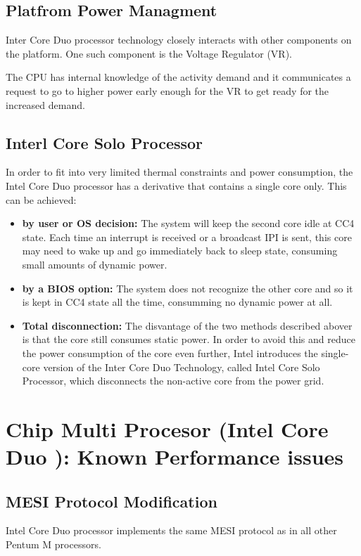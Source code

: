 \subsection{Platfrom Power Managment}
Inter Core Duo processor technology closely interacts with other components on the platform. One such component is the Voltage Regulator (VR).

The CPU has internal knowledge of the activity demand and it communicates a request to go to higher power early enough for the VR to get ready for the increased demand.

\subsection{Interl Core Solo Processor}
In order to fit into very limited thermal constraints and power consumption, the Intel Core Duo processor has a derivative that contains a single core only. This can be achieved:

\begin{itemize}
	\item \textbf{by user or OS decision: }The system will keep the second core idle at CC4 state. Each time an interrupt is received or a broadcast IPI is sent, this core may need to wake up and go immediately back to sleep state, consuming small amounts of dynamic power.
	\item \textbf{by a BIOS option:} The system does not recognize the other core and so it is kept in CC4 state all the time, consumming no dynamic power at all.
	\item \textbf{Total disconnection:} The disvantage of the two methods described abover is that the core still consumes static power. In order to avoid this and reduce the power consumption of the core even further, Intel introduces the single-core version of the Inter Core Duo Technology, called Intel Core Solo Processor, which disconnects the non-active core from the power grid.
\end{itemize}

\newpage
\section{Chip Multi Procesor (Intel Core Duo \cite{Mendelson:2006:CIS}): Known Performance issues}

\subsection{MESI Protocol Modification}
Intel Core Duo processor implements the same MESI protocol as in all other Pentum M processors.

